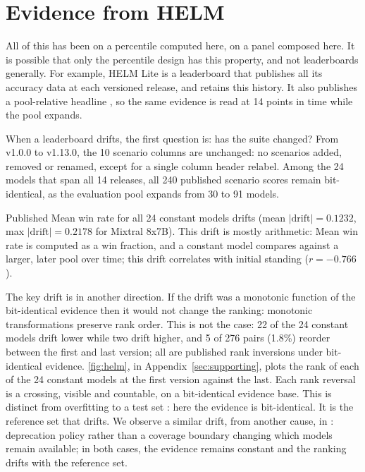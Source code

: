 \section{Evidence from HELM}\label{sec:external}

All of this has been on a percentile computed here, on a panel composed here. It is possible that only the percentile design has this property, and not leaderboards generally. For example, HELM Lite is a leaderboard that publishes all its accuracy data at each versioned release, and retains this history. It also publishes a pool-relative headline \citep{liang2022helm}, so the same evidence is read at 14 points in time while the pool expands.

When a leaderboard drifts, the first question is: has the suite changed? From v1.0.0 to v1.13.0, the 10 scenario columns are unchanged: no scenarios added, removed or renamed, except for a single column header relabel. Among the 24 models that span all 14 releases, all 240 published scenario scores remain bit-identical, as the evaluation pool expands from 30 to 91 models.

Published Mean win rate for all 24 constant models drifts (mean $|\text{drift}| = 0.1232$, max $|\text{drift}| = 0.2178$ for Mixtral 8x7B). This drift is mostly arithmetic: Mean win rate is computed as a win fraction, and a constant model compares against a larger, later pool over time; this drift correlates with initial standing ($r = -0.766$).

The key drift is in another direction. If the drift was a monotonic function of the bit-identical evidence then it would not change the ranking: monotonic transformations preserve rank order. This is not the case: 22 of the 24 constant models drift lower while two drift higher, and 5 of 276 pairs (1.8\%) reorder between the first and last version; all are published rank inversions under bit-identical evidence. \autoref{fig:helm}, in Appendix~\ref{sec:supporting}, plots the rank of each of the 24 constant models at the first version against the last. Each rank reversal is a crossing, visible and countable, on a bit-identical evidence base. This is distinct from overfitting to a test set \citep{roelofs2019meta}: here the evidence is bit-identical. It is the reference set that drifts. We observe a similar drift, from another cause, in \citet{singh2025leaderboard}: deprecation policy rather than a coverage boundary changing which models remain available; in both cases, the evidence remains constant and the ranking drifts with the reference set.


